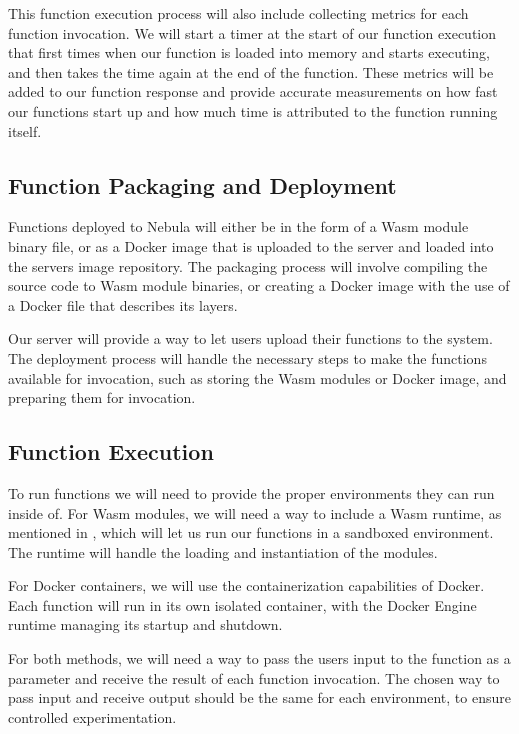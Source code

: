 \documentclass[
  table]{report}
\begin{document}
This function execution process will also include collecting metrics for
each function invocation. We will start a timer at the start of our
function execution that first times when our function is loaded into
memory and starts executing, and then takes the time again at the end of
the function. These metrics will be added to our function response and
provide accurate measurements on how fast our functions start up and how
much time is attributed to the function running itself.

\subsection{Function Packaging and Deployment}

Functions deployed to Nebula will either be in the form of a \ac{Wasm}
module binary file, or as a Docker image that is uploaded to the server
and loaded into the servers image repository. The packaging process will
involve compiling the source code to \ac{Wasm} module binaries, or
creating a Docker image with the use of a Docker file that describes its
layers.

Our server will provide a way to let users upload their functions to the
system. The deployment process will handle the necessary steps to make
the functions available for invocation, such as storing the \ac{Wasm}
modules or Docker image, and preparing them for invocation.

\subsection{Function Execution}

To run functions we will need to provide the proper environments they
can run inside of. For \ac{Wasm} modules, we will need a way to include
a \ac{Wasm} runtime, as mentioned in , which
will let us run our functions in a sandboxed environment. The runtime
will handle the loading and instantiation of the modules.

For Docker containers, we will use the containerization capabilities of
Docker. Each function will run in its own isolated container, with the
Docker Engine runtime managing its startup and shutdown.

For both methods, we will need a way to pass the users input to the
function as a parameter and receive the result of each function
invocation. The chosen way to pass input and receive output should be
the same for each environment, to ensure controlled experimentation.
\end{document}
